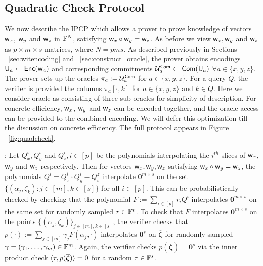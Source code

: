 \subsection{Quadratic Check Protocol}\label{sec:quadcheck}
We now describe the IPCP which allows a prover to prove knowledge of vectors
$\mathsf{w}_x$, $\mathsf{w}_y$ and $\mathsf{w}_z$ in $\mathbb{F}^N$, satisfying $\mathsf{w}_x\circ \mathsf{w}_y =
\mathsf{w}_z$. As before we view $\mathsf{w}_x, \mathsf{w}_y$ and $\mathsf{w}_z$ as $p \times m \times s$ matrices, where $N=pms$. 
As described previously in Sections ~\ref{sec:witencoding} and ~\ref{sec:construct_oracle}, the prover obtains encodings $\mathsf{U}_a \leftarrow \mathsf{Enc}(\mathsf{w}_a)$ and corresponding 
commitments $\mathcal{U}^{\mathsf{Com}}_a \leftarrow \mathsf{Com}(\mathsf{U}_a)$ $\forall a\in \{x,y,z\}$. The prover
sets up the oracles $\pi_a := \mathcal{U}^{\mathsf{Com}}_a$ for $a\in \{x,y,z\}$. For a query $Q$,
the verifier is provided the columns $\pi_a[\cdot,k]$ for $a\in \{x,y,z\}$ and $k\in Q$. 
Here we consider oracle as consisting of three sub-oracles for simplicity of description. For
concrete efficiency, $\mathsf{w}_x$, $\mathsf{w}_y$ and $\mathsf{w}_z$ can be encoded together, and the oracle
access can be provided to the combined encoding. We will defer this optimization till the 
discussion on concrete efficiency. The full protocol appears in Figure ~\ref{fig:quadcheck}. 


: Let $Q^i_x,Q^i_y$ and $Q^i_z, i\in [p]$ be the
polynomials interpolating the $i^{th}$ slices of $\mathsf{w}_x$, $\mathsf{w}_y$ and $\mathsf{w}_z$ respectively.
Then for vectors $\mathsf{w}_x,\mathsf{w}_y,\mathsf{w}_z$ satisfying
$\mathsf{w}_x\circ \mathsf{w}_y=\mathsf{w}_z$, the polynomials $Q^i=Q^i_x\cdot Q^i_y - Q^z_i$ interpolate
$\bm{0}^{m\times s}$ on the set $\{(\alpha_j,\zeta_k):j\in [m],k\in [s]\}$ for all $i\in [p]$. 
This can be probabilistically
checked by checking that the polynomial $F := \sum_{i\in [p]}r_iQ^i$ interpolates
$\bm{0}^{m\times s}$ on the same set for randomly sampled $r\in \mathbb{F}^p$. 
To check that $F$ interpolates $\bm{0}^{m\times s}$ on the points
$\{(\alpha_j,\zeta_k)\}_{j\in [m],k\in [s]}$, the verifier checks that
$p(\cdot) := \sum_{j\in [m]}\gamma_jF(\alpha_j,\cdot)$ interpolates $\bm{0}^s$ on
$\overline{\bm{\zeta}}$ for randomly sampled $\gamma=(\gamma_1,\ldots,\gamma_m)\in \mathbb{F}^m$.
Again, the verifier checks $p(\overline{\bm{\zeta}})=\bm{0}^s$ via the inner product
check $\langle \tau,p(\overline{\bm{\zeta}})\rangle=0$ for a random $\tau\in \mathbb{F}^s$. 

